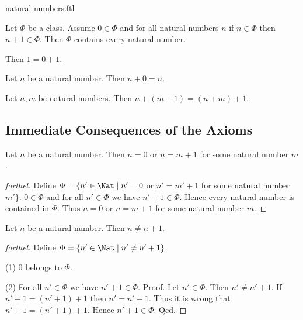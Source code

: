 \documentclass{naproche-library}
\begin{document}
\begin{smodule}{natural-numbers.ftl}
  \begin{axiom}[forthel,title=Induction,id=ARITHMETIC_01_4764664342773760]
    Let $\Phi$ be a class.
    Assume $0 \in \Phi$ and for all natural numbers $n$ if $n \in \Phi$ then
    $n + 1 \in \Phi$.
    Then $\Phi$ contains every natural number.
  \end{axiom}

  \begin{axiom}[forthel,id=ARITHMETIC_03_5962332515874540]
    Then $1 = 0 + 1$.
  \end{axiom}

  \begin{axiom}[forthel,id=ARITHMETIC_03_4827955356237824]
    Let $n$ be a natural number.
    Then $n + 0 = n$.
  \end{axiom}

  \begin{axiom}[forthel,id=ARITHMETIC_03_4427935386238924]
    Let $n, m$ be natural numbers.
    Then $n + (m + 1) = (n + m) + 1$.
  \end{axiom}


  \subsection*{Immediate Consequences of the Axioms}

  \begin{proposition}[forthel,id=ARITHMETIC_01_4966080109871104]
    Let $n$ be a natural number.
    Then $n = 0$ or $n = m + 1$ for some natural number $m$.
  \end{proposition}
  \begin{proof}[forthel]
    Define $\Phi = \{ n' \in \Nat \mid n' = 0$ or $n' = m' + 1$ for some natural number $m' \}$.
    $0 \in \Phi$ and for all $n' \in  \Phi$ we have $n' + 1 \in \Phi$.
    Hence every natural number is contained in $\Phi$.
    Thus $n = 0$ or $n = m + 1$ for some natural number $m$.
  \end{proof}

  \begin{proposition}[forthel,id=ARITHMETIC_01_5996049267163136]
    Let $n$ be a natural number.
    Then $n \neq n + 1$.
  \end{proposition}
  \begin{proof}[forthel]
    Define $\Phi = \{ n' \in \Nat \mid n' \neq n' + 1 \}$.

    (1) $0$ belongs to $\Phi$.

    (2) For all $n' \in \Phi$ we have $n' + 1 \in \Phi$. \newline
    Proof.
      Let $n' \in \Phi$.
      Then $n' \neq n' + 1$.
      If $n' + 1 = (n' + 1) + 1$ then $n' = n' + 1$.
      Thus it is wrong that $n' + 1 = (n' + 1) + 1$.
      Hence $n' + 1 \in \Phi$.
    Qed.


\end{proof}
\end{smodule}
\end{document}
